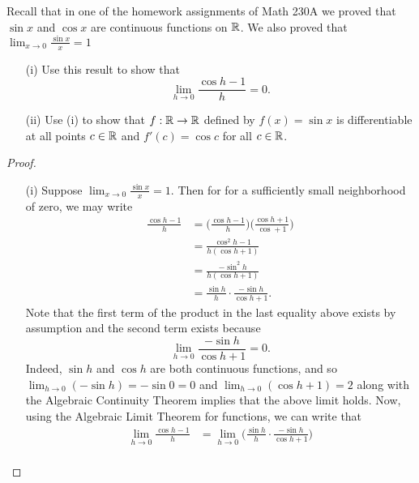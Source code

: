 \documentclass[a4paper]{article}
\begin{document}
\begin{problem}
    Recall that in one of the homework assignments of Math 230A we proved that \( \sin x  \) and \( \cos x  \) are continuous functions on \( \mathbb{R}  \). We also proved that \( \displaystyle \lim_{ x \to 0 }  \frac{ \sin x  }{  x  }  = 1  \)
   \begin{enumerate}
       \item[(i)] Use this result to show that 
           \[  \lim_{ h \to 0 }  \frac{ \cos h - 1  }{ h  }  = 0.  \]
        \item[(ii)] Use (i) to show that \( f: \mathbb{R} \to \mathbb{R}  \) defined by \( f(x) = \sin x  \) is differentiable at all points \( c \in \mathbb{R}  \) and \( f'(c) = \cos c  \) for all \( c \in \mathbb{R}  \).
   \end{enumerate} 
\end{problem}
\begin{proof}
\begin{enumerate}
    \item[(i)] Suppose \( \lim_{ x \to 0 }  \displaystyle \frac{ \sin x  }{  x  }  = 1  \). Then for for a sufficiently small neighborhood of zero, we may write
        \begin{align*}
            \frac{ \cos h - 1  }{  h  }  &= \Big(  \frac{ \cos h - 1  }{ h  }  \Big) \Big( \frac{ \cos h + 1  }{  \cos + 1  }  \Big) \\
                                         &= \frac{ \cos^{2} h - 1  }{  h (\cos h +  1 ) } \\
                                         &= \frac{ - \sin^{2} h  }{  h (\cos h + 1 ) } \\ 
                                         &= \frac{ \sin h  }{  h  }  \cdot \frac{ - \sin h  }{  \cos h + 1  }.
        \end{align*}
        Note that the first term of the product in the last equality above exists by assumption and the second term exists because 
        \[  \lim_{ h \to 0 }  \frac{ - \sin h  }{  \cos h + 1  } = 0.  \]
        Indeed, \( \sin h  \) and \( \cos h  \) are both continuous functions, and so \( \lim_{ h \to 0 } (-\sin h) =  - \sin 0 = 0   \) and \( \lim_{ h \to 0 } (  \cos h + 1 ) = 2 \) along with the Algebraic Continuity Theorem implies that the above limit holds. 
        Now, using the Algebraic Limit Theorem for functions, we can write that 
        \begin{align*}
            \lim_{ h \to 0 }  \frac{ \cos h - 1  }{  h  } &= \lim_{ h \to 0 } \Big(  \frac{ \sin h  }{  h  }  \cdot \frac{ - \sin h  }{ \cos h + 1  } \Big)  \\

\end{align*}
\end{enumerate}
\end{proof}
\end{document}
